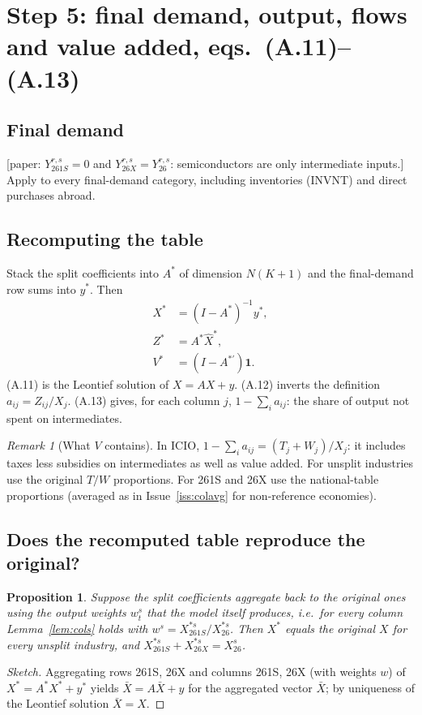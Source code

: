 \documentclass[11pt,a4paper]{article}
\newtheorem{proposition}{Proposition}
\theoremstyle{remark}
\newtheorem{remark}{Remark}
\theoremstyle{definition}
\newcommand{\sem}{{261S}}   %
\newcommand{\oth}{{26X}}    %
\newcommand{\agg}{{26}}     %
\newcommand{\paper}[1]{\textcolor{blue!50!black}{[paper: #1]}}
\begin{document}
\section{Step 5: final demand, output, flows and value added, eqs.~(A.11)--(A.13)}

\subsection{Final demand}
\paper{$Y^{r,s}_\sem = 0$ and $Y^{r,s}_\oth = Y^{r,s}_\agg$: semiconductors are only intermediate inputs.}
Apply to every final-demand category, including inventories (INVNT) and direct purchases abroad.

\subsection{Recomputing the table}
Stack the split coefficients into $A^\ast$ of dimension $N(K+1)$ and the final-demand row sums into $y^\ast$. Then
\begin{align}
  X^\ast &= (I-A^\ast)^{-1}y^\ast, \tag{A.11}\\
  Z^\ast &= A^\ast\hat X^\ast, \tag{A.12}\\
  V^\ast &= (I-A^{\ast\prime})\mathbf 1 . \tag{A.13}
\end{align}
(A.11) is the Leontief solution of $X = AX + y$. (A.12) inverts the definition $a_{ij}=Z_{ij}/X_j$.
(A.13) gives, for each column $j$, $1-\sum_i a_{ij}$: the share of output not spent on intermediates.

\begin{remark}[What $V$ contains]
In ICIO, $1-\sum_i a_{ij} = (T_j + W_j)/X_j$: it includes taxes less subsidies on intermediates as well as value
added. For unsplit industries use the original $T/W$ proportions. For \sem{} and \oth{} use the national-table
proportions (averaged as in Issue~\ref{iss:colavg} for non-reference economies).
\end{remark}

\subsection{Does the recomputed table reproduce the original?}\label{sec:checks}

\begin{proposition}
Suppose the split coefficients aggregate back to the original ones using the output weights $w^s_t$ that the
model itself produces, i.e.\ for every column Lemma~\ref{lem:cols} holds with $w^s = X^{\ast s}_\sem/X^{\ast s}_\agg$.
Then $X^\ast$ equals the original $X$ for every unsplit industry, and $X^{\ast s}_\sem + X^{\ast s}_\oth = X^s_\agg$.
\end{proposition}
\begin{proof}[Sketch]
Aggregating rows \sem, \oth{} and columns \sem, \oth{} (with weights $w$) of $X^\ast = A^\ast X^\ast + y^\ast$ yields
$\bar X = A\bar X + y$ for the aggregated vector $\bar X$; by uniqueness of the Leontief solution $\bar X = X$.
\end{proof}
\end{document}
